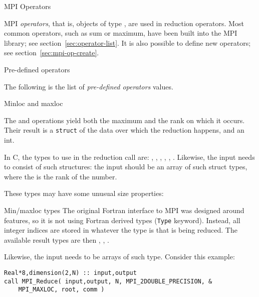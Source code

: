 
 {MPI Operators}
\label{sec:mpi-ops}

MPI \emph{operators},
that is, objects of type ,
are used in reduction operators.
Most common
operators, such as sum or maximum, have been built into the MPI
library; see section~\ref{sec:operator-list}.
It is also possible to define new operators; 
see section~\ref{sec:mpi-op-create}.

 {Pre-defined operators}
\label{sec:operator-list}

The following is the list of \emph{pre-defined operators}
 values.



 {Minloc and maxloc}
\label{sec:minmaxloc}

The  and  operations
yield both the maximum and the rank on which it occurs. Their result
is a \lstinline{struct} of the data over which the reduction happens,
and an int. 

In C, the types to use in the reduction call are:
,
,
,
,
,
.
Likewise, the input needs to consist of such structures:
the input should be an array of such struct types, where the  is
the rank of the number.

These types may have some unusual size properties:
%

\begin{fortrannote}{Min/maxloc types}
  The original Fortran interface to MPI was designed around
   features,
  so it is not using Fortran derived types (\lstinline{Type} keyword).
  Instead, all integer indices are stored in whatever the type is that is
  being reduced. The available result types are then
  ,
  ,
  .

  Likewise, the input needs to be arrays of such type. Consider this example:
  \lstset{language=Fortran}
\begin{lstlisting}
Real*8,dimension(2,N) :: input,output
call MPI_Reduce( input,output, N, MPI_2DOUBLE_PRECISION, &
    MPI_MAXLOC, root, comm )
\end{lstlisting}
\end{fortrannote}

